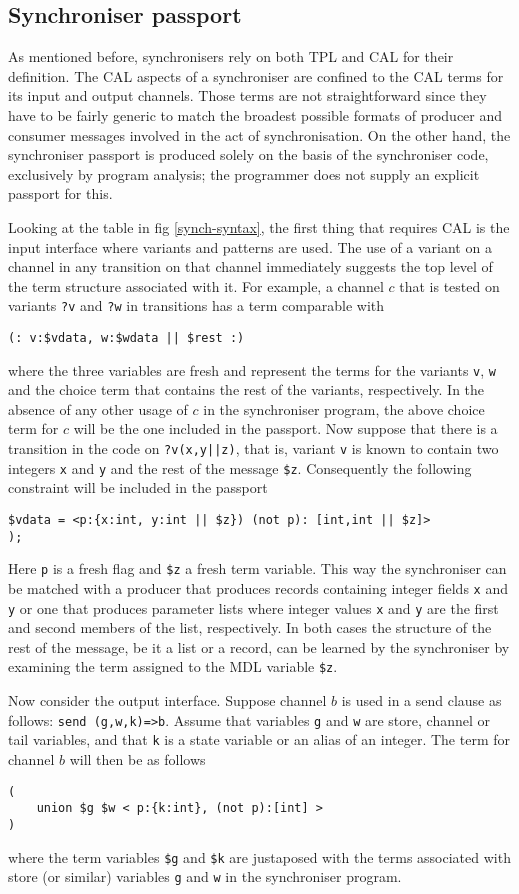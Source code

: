 \documentclass[11pt]{report}
\begin{document}
\subsection{Synchroniser passport}

As mentioned before, synchronisers rely on both TPL and CAL for their definition. The CAL aspects of a synchroniser are confined to the CAL terms for its input and output channels. Those terms are not straightforward since they have to be fairly generic to match the broadest possible formats of producer and consumer messages involved in the act of synchronisation.  On the other hand, the synchroniser passport is produced solely on the basis of the synchroniser code, exclusively by program analysis; the programmer does not supply an explicit passport for this.

Looking at the table in fig \ref{synch-syntax}, the first thing that requires CAL is the input interface where variants and patterns are used. The use of a variant on a channel in any transition on that channel immediately suggests the top level of the term structure associated with it. For example, a channel $c$ that is tested on variants
\verb$?v$ and \verb$?w$ in transitions has a term comparable with
\begin{verbatim}
(: v:$vdata, w:$wdata || $rest :)
\end{verbatim}
where the three variables are fresh and represent the terms for the variants \verb$v$, \verb$w$ and the choice term that contains the rest of the variants, respectively.  In the absence of any other usage of $c$ in the synchroniser program, the above choice term for $c$ will be the one included in the passport. Now suppose that there is a transition in the code on \verb$?v(x,y||z)$, that is, variant \verb$v$ is known to contain two integers \verb$x$ and \verb$y$ and the rest of the message \verb"$z". Consequently the following constraint will be included in the passport
\begin{verbatim}
$vdata = <p:{x:int, y:int || $z}) (not p): [int,int || $z]>
);
\end{verbatim}
Here \verb"p" is a fresh flag and \verb"$z" a fresh term variable. This way the synchroniser can be matched with a producer that produces records containing integer fields \verb$x$ and \verb$y$ or one that produces parameter lists where integer values \verb$x$ and \verb$y$ are the first and second members of the list, respectively. In both cases the structure of the rest of the message, be it a list or a record, can be learned by the synchroniser by examining the term assigned to the MDL variable \verb"$z".

Now consider the output interface. Suppose channel $b$ is used in a send clause as follows:
\verb"send (g,w,k)=>b". Assume that  variables \verb$g$ and \verb$w$ are store, channel or tail variables,
and that \verb"k" is a state variable or an alias of an integer. The term for channel $b$ will then be as follows
\begin{verbatim}
(
	union $g $w < p:{k:int}, (not p):[int] >
)
\end{verbatim}
where the term variables \verb"$g" and \verb"$k" are justaposed with the terms associated with store (or similar) variables \verb"g" and \verb"w" in the synchroniser program.
\end{document}
